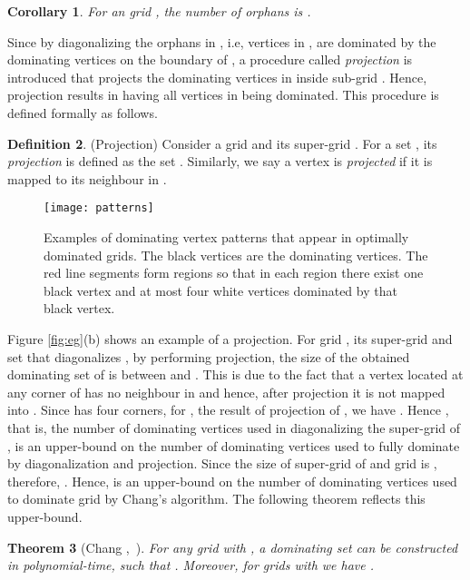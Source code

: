 \documentclass[letterpaper, 10pt, conference]{ieeeconf}
\newtheorem{theorem}{Theorem}[section]
\newtheorem{corollary}[theorem]{Corollary}
\theoremstyle{definition}
\newtheorem{definition}[theorem]{Definition}
\theoremstyle{remark}
\begin{document}
\begin{corollary}
\label{cor:orphan-n+m}
For an  grid , the number of orphans is .
\end{corollary}

Since by diagonalizing  the orphans in , i.e, vertices in , are dominated by the dominating vertices on the boundary of , a procedure called \emph{projection} is introduced that projects the dominating vertices in  inside sub-grid . Hence, projection results in having all vertices in  being dominated. This procedure is defined formally as follows.

\begin{definition}(Projection)
\label{def:porjection}
Consider a grid  and its super-grid . For a set , its \emph{projection} is defined as
the set . 
Similarly, we say a vertex  is \emph{projected} if it is mapped to its neighbour in .
\end{definition}


\begin{figure}[t]
\texttt{[image: patterns]}
\vspace{-1cm}
\caption{Examples of dominating vertex patterns
that appear in optimally dominated grids. The black vertices are the dominating vertices. The red line segments form regions so that in each region there exist one black vertex and at most four white vertices dominated by that black vertex.}
\label{fig:patterns}
\end{figure}

Figure \ref{fig:eg}(b) shows an example of a projection.
For grid , its super-grid  and set  that diagonalizes , by performing projection, the size of the obtained dominating set of  is between  and . This is due to the fact that a vertex  located at any corner of  has no neighbour in  and hence, after projection it is not mapped into . Since  has four corners, for , the result of projection of , we have . Hence , that is, the number of dominating vertices used in diagonalizing the super-grid of , is an upper-bound on the number of dominating vertices used to fully dominate  by diagonalization and projection. Since the size of super-grid of and  grid  is , therefore, . Hence,  is an upper-bound on the number of dominating vertices used to dominate grid  by Chang's algorithm. The following theorem reflects this upper-bound.

\begin{theorem}[Chang ,~\cite{TYC'92}]
\label{theo:upper-bound}
For any  grid  with , a dominating set  can be constructed in polynomial-time, such that . Moreover, for grids with  we have .
\end{theorem}
\end{document}
